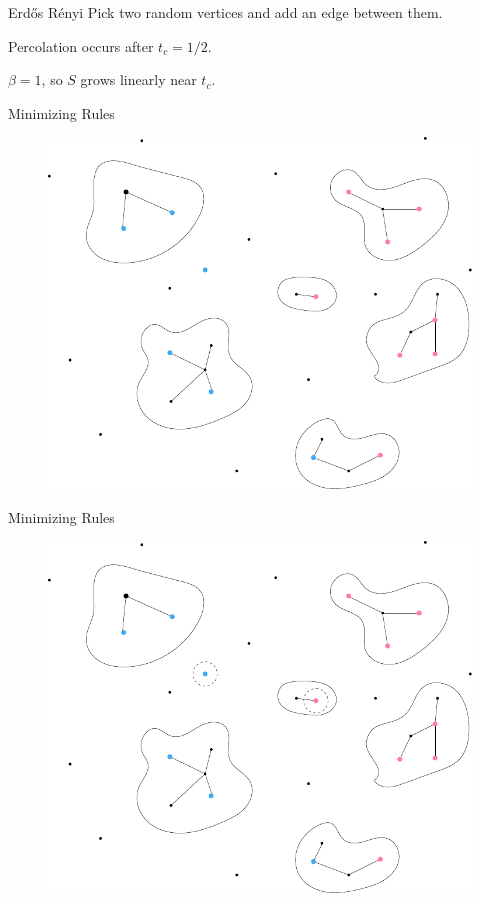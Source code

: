 \documentclass{beamer}
\newcommand{\ER}{Erd\H{o}s R\'enyi\xspace}
\begin{document}
\begin{frame}{\ER}
	Pick two random vertices and add an edge between them.
	\vspace{5mm}

	\pause
	Percolation occurs after $t_c=1/2$.
	\vspace{5mm}

	$\beta=1$, so $S$ grows linearly near $t_c$.
\end{frame}

\begin{frame}{Minimizing Rules}
	\begin{figure}[H]
		\centering
		\includegraphics[scale=0.7]{fig/minimizing-1.pdf}
	\end{figure}
\end{frame}

\begin{frame}{Minimizing Rules}
	\begin{figure}[H]
		\centering
		\includegraphics[scale=0.7]{fig/minimizing-2.pdf}
	\end{figure}
\end{frame}
\end{document}
